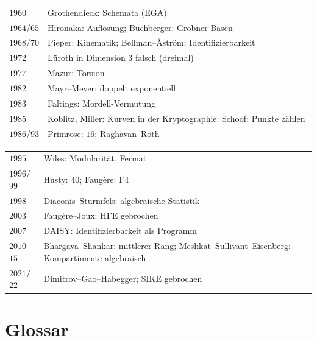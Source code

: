 \begin{merksatz}
\begin{center}
{\begin{tabular}{@{}P{1.2cm}P{7.4cm}@{}}
$1960$ & Grothendieck: Schemata (EGA)\\
$1964$/$65$ & Hironaka: Auflösung; Buchberger: Gröbner-Basen\\
$1968$/$70$ & Pieper: Kinematik; Bellman--Åström: Identifizierbarkeit\\
$1972$ & Lüroth in Dimension $3$ falsch (dreimal)\\
$1977$ & Mazur: Torsion\\
$1982$ & Mayr--Meyer: doppelt exponentiell\\
$1983$ & Faltings: Mordell-Vermutung\\
$1985$ & Koblitz, Miller: Kurven in der Kryptographie; Schoof: Punkte zählen\\
$1986$/$93$ & Primrose: $16$; Raghavan--Roth\\
\bottomrule
\end{tabular}}
\end{center}
\begin{center}
{\small
\renewcommand{\arraystretch}{1.42}
\begin{tabular}{@{}P{1.2cm}P{7.4cm}@{}}
\toprule
$1995$ & Wiles: Modularität, Fermat\\
$1996$/$99$ & Husty: $40$; Faugère: F4\\
$1998$ & Diaconis--Sturmfels: algebraische Statistik\\
$2003$ & Faugère--Joux: HFE gebrochen\\
$2007$ & DAISY: Identifizierbarkeit als Programm\\
$2010$--$15$ & Bhargava--Shankar: mittlerer Rang; Meshkat--Sullivant--Eisenberg: Kompartimente algebraisch\\
$2021$/$22$ & Dimitrov--Gao--Habegger; SIKE gebrochen\\
\bottomrule
\end{tabular}}
\end{center}
\end{merksatz}

\section{Glossar}

